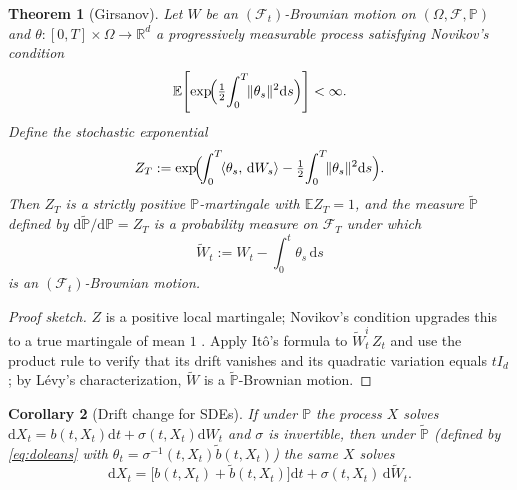 \documentclass[11pt,letterpaper]{article}
\theoremstyle{plain}
\newtheorem{theorem}{Theorem}[section]
\newtheorem{corollary}[theorem]{Corollary}
\theoremstyle{definition}
\theoremstyle{remark}
\newcommand{\R}{\mathbb{R}}
\newcommand{\E}{\mathbb{E}}
\newcommand{\Prob}{\mathbb{P}}
\newcommand{\dd}{\mathrm{d}}
\newcommand{\calF}{\mathcal{F}}
\newcommand{\inner}[2]{\langle #1,\,#2\rangle}
\newcommand{\norm}[1]{\lVert #1\rVert}
\begin{document}
\begin{theorem}[Girsanov]\label{thm:girsanov}
Let $W$ be an $(\calF_t)$-Brownian motion on $(\Omega,\calF,\Prob)$ and
$\theta:[0,T]\times\Omega\to\R^d$ a progressively measurable process
satisfying \emph{Novikov's condition}
\begin{equation}
  \E\!\left[\exp\!\Bigl(\tfrac12\!\int_0^T\!\norm{\theta_s}^2\dd s\Bigr)\right]<\infty.
  \label{eq:novikov}
\end{equation}
Define the \emph{stochastic exponential}
\begin{equation}
  Z_T := \exp\!\Bigl(\!\int_0^T\!\inner{\theta_s}{\dd W_s}
                     -\tfrac12\!\int_0^T\!\norm{\theta_s}^2\dd s\Bigr).
  \label{eq:doleans}
\end{equation}
Then $Z_T$ is a strictly positive $\Prob$-martingale with $\E Z_T=1$, and
the measure $\widetilde{\Prob}$ defined by
$\dd\widetilde{\Prob}/\dd\Prob=Z_T$ is a probability measure on
$\calF_T$ under which
\begin{equation}
  \widetilde{W}_t := W_t - \int_0^t\theta_s\,\dd s
  \label{eq:girsanov-BM}
\end{equation}
is an $(\calF_t)$-Brownian motion.
\end{theorem}
\begin{proof}[Proof sketch]
$Z$ is a positive local martingale; Novikov's condition upgrades this to a
true martingale of mean $1$ \citep[Cor.~3.5.14]{karatzas1991bm}. Apply
It\^o's formula to $\widetilde{W}_t^i\,Z_t$ and use the product rule to
verify that its drift vanishes and its quadratic variation equals
$tI_d$; by L\'evy's characterization, $\widetilde{W}$ is a
$\widetilde{\Prob}$-Brownian motion.
\end{proof}

\begin{corollary}[Drift change for SDEs]\label{cor:drift}
If under $\Prob$ the process $X$ solves
$\dd X_t=b(t,X_t)\dd t+\sigma(t,X_t)\dd W_t$ and $\sigma$ is invertible,
then under $\widetilde{\Prob}$ (defined by \eqref{eq:doleans} with
$\theta_t=\sigma^{-1}(t,X_t)\tilde b(t,X_t)$) the same $X$ solves
\[
  \dd X_t=\bigl[b(t,X_t)+\tilde b(t,X_t)\bigr]\dd t+\sigma(t,X_t)\,\dd\widetilde{W}_t.
\]
\end{corollary}
\end{document}
